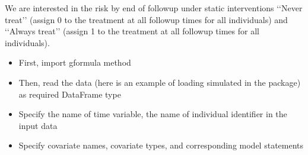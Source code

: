 \documentclass[letterpaper,10pt,english]{sphinxmanual}
\begin{document}
\sphinxAtStartPar
We are interested in the risk by end of follow\sphinxhyphen{}up under static interventions ‘‘Never treat’’ (assign 0 to the treatment at all follow\sphinxhyphen{}up times for all individuals)
and ‘‘Always treat’’ (assign 1 to the treatment at all follow\sphinxhyphen{}up times for all individuals).
\begin{itemize}
\item {} 
\sphinxAtStartPar
First, import g\sphinxhyphen{}formula method

\begin{sphinxVerbatim}[commandchars=\\\{\}]
 
   
\end{sphinxVerbatim}

\item {} 
\sphinxAtStartPar
Then, read the data (here is an example of loading simulated  in the package) as required DataFrame type

\begin{sphinxVerbatim}[commandchars=\\\{\}]
   
  
\end{sphinxVerbatim}

\item {} 
\sphinxAtStartPar
Specify the name of time variable, the name of individual identifier in the input data

\begin{sphinxVerbatim}[commandchars=\\\{\}]
  
  
\end{sphinxVerbatim}

\item {} 
\sphinxAtStartPar
Specify covariate names, covariate types, and corresponding model statements


\end{itemize}
\end{document}
